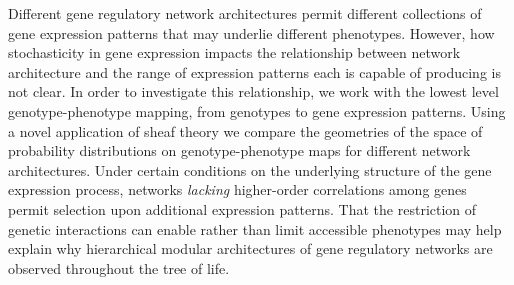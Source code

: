 Different gene regulatory network architectures permit different collections of gene expression patterns that may underlie different phenotypes. However, how stochasticity in gene expression impacts the relationship between network architecture and the range of expression patterns each is capable of producing is not clear. In order to investigate this relationship, we work with the lowest level genotype-phenotype mapping, from genotypes to gene expression patterns. Using a novel application of sheaf theory we compare the geometries of the space of probability distributions on genotype-phenotype maps for different network architectures. Under certain conditions on the underlying structure of the gene expression process, networks \emph{lacking} higher-order correlations among genes permit selection upon additional expression patterns. That the restriction of genetic interactions can enable rather than limit accessible phenotypes may help explain why hierarchical modular architectures of gene regulatory networks are observed throughout the tree of life.

